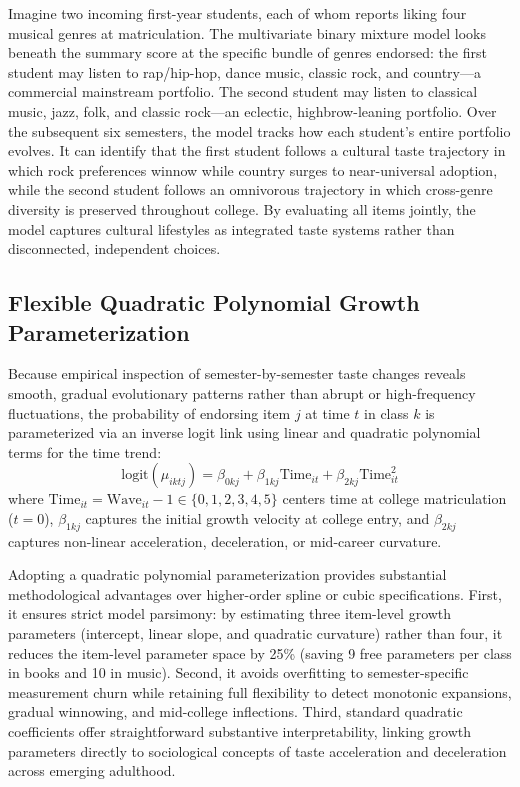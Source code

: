 \documentclass[12pt]{article}
\begin{document}
Imagine two incoming first-year students, each of whom reports liking four musical genres at matriculation. The multivariate binary mixture model looks beneath the summary score at the specific bundle of genres endorsed: the first student may listen to rap/hip-hop, dance music, classic rock, and country---a commercial mainstream portfolio. The second student may listen to classical music, jazz, folk, and classic rock---an eclectic, highbrow-leaning portfolio. Over the subsequent six semesters, the model tracks how each student's entire portfolio evolves. It can identify that the first student follows a cultural taste trajectory in which rock preferences winnow while country surges to near-universal adoption, while the second student follows an omnivorous trajectory in which cross-genre diversity is preserved throughout college. By evaluating all items jointly, the model captures cultural lifestyles as integrated taste systems rather than disconnected, independent choices.

\subsection{Flexible Quadratic Polynomial Growth Parameterization}

Because empirical inspection of semester-by-semester taste changes reveals smooth, gradual evolutionary patterns rather than abrupt or high-frequency fluctuations, the probability of endorsing item $j$ at time $t$ in class $k$ is parameterized via an inverse logit link using linear and quadratic polynomial terms for the time trend:
\begin{equation}
\text{logit}(\mu_{iktj}) = \beta_{0kj} + \beta_{1kj} \text{Time}_{it} + \beta_{2kj} \text{Time}_{it}^2
\end{equation}
where $\text{Time}_{it} = \text{Wave}_{it} - 1 \in \{0, 1, 2, 3, 4, 5\}$ centers time at college matriculation ($t = 0$), $\beta_{1kj}$ captures the initial growth velocity at college entry, and $\beta_{2kj}$ captures non-linear acceleration, deceleration, or mid-career curvature.

Adopting a quadratic polynomial parameterization provides substantial methodological advantages over higher-order spline or cubic specifications. First, it ensures strict model parsimony: by estimating three item-level growth parameters (intercept, linear slope, and quadratic curvature) rather than four, it reduces the item-level parameter space by 25\% (saving 9 free parameters per class in books and 10 in music). Second, it avoids overfitting to semester-specific measurement churn while retaining full flexibility to detect monotonic expansions, gradual winnowing, and mid-college inflections. Third, standard quadratic coefficients offer straightforward substantive interpretability, linking growth parameters directly to sociological concepts of taste acceleration and deceleration across emerging adulthood.
\end{document}
